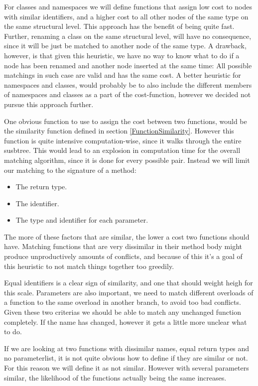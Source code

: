 \documentclass[11pt]{article}
\begin{document}
For classes and namespaces we will define functions that assign low cost to nodes with similar identifiers, and a higher cost to all other nodes of the same type on the same structural level. This approach has the benefit of being quite fast. Further, renaming a class on the same structural level, will have no consequence, since it will be just be matched to another node of the same type. A drawback, however, is that given this heuristic, we have no way to know what to do if a node has been renamed and another node inserted at the same time: All possible matchings in such case are valid and has the same cost. A better heuristic for namespaces and classes, would probably be to also include the different members of namespaces and classes as a part of the cost-function, however we decided not pursue this approach further.

One obvious function to use to assign the cost between two functions, would be the similarity function defined in section \ref{FunctionSimilarity}. However this function is quite intensive computation-wise, since it walks through the entire susbtree. This would lead to an explosion in computation time for the overall matching algorithm, since it is done for every possible pair. Instead we will limit our matching to the signature of a method:

\begin{itemize}
    \item The return type.
    \item The identifier.
    \item The type and identifier for each parameter.
\end{itemize}

The more of these factors that are similar, the lower a cost two functions should have. Matching functions that are very dissimilar in their method body might produce unproductively amounts of conflicts, and because of this it's a goal of this heuristic to not match things together too greedily.

Equal identifiers is a clear sign of similarity, and one that should weight heigh for this scale. Parameters are also important, we need to match different overloads of a function to the same overload in another branch, to avoid too bad conflicts. Given these two criterias we should be able to match any unchanged function completely. If the name has changed, however it gets a little more unclear what to do.

If we are looking at two functions with dissimilar names, equal return types and no parameterlist, it is not quite obvious how to define if they are similar or not. For this reason we will define it as not similar. However with several parameters similar, the likelihood of the functions actually being the same increases. 
\end{document}
